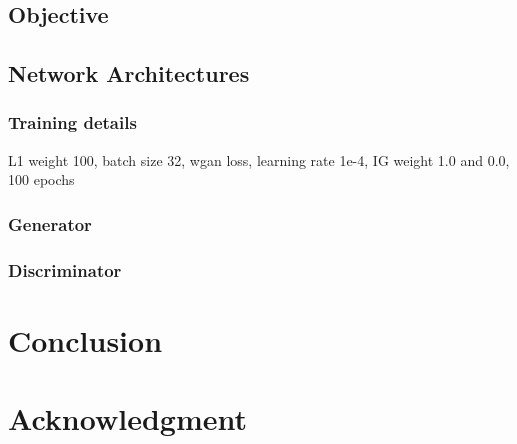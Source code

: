 \documentclass[conference]{IEEEtran}
\begin{document}
\subsection{Objective}



\subsection{Network Architectures}


\subsubsection{Training details}

L1 weight 100, batch size 32, wgan loss, learning rate 1e-4, IG weight 1.0 and 0.0, 100 epochs


\subsubsection{Generator}



\subsubsection{Discriminator}



\section{Conclusion}



\section*{Acknowledgment}

%
%

\end{document}
